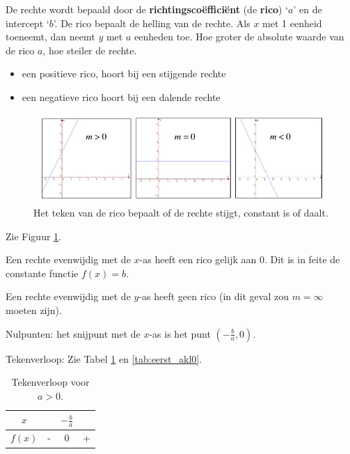 \noindent De rechte wordt bepaald door de \textbf{richtingsco\"effici\"ent}
(de \textbf{rico}) \textquoteleft $a$\textquoteright{} en de intercept
\textquoteleft $b$\textquoteright . De rico bepaalt de helling van
de rechte. Als $x$ met 1 eenheid toeneemt, dan neemt $y$ met $a$
eenheden toe. Hoe groter de absolute waarde van de rico $a$, hoe
steiler de rechte.
\begin{itemize}
\item een positieve rico, hoort bij een stijgende rechte
\item een negatieve rico hoort bij een dalende rechte
\end{itemize}
\begin{figure}[h]
\centering{}\includegraphics[width=\linewidth]{2_elem_rekenvaardigheden_B/inputs/eerstegraadsfuncties2.jpg} 
\caption{Het teken van de rico bepaalt of de rechte stijgt, constant is of daalt.}
\label{fig:rico}
\end{figure}

Zie Figuur \ref{fig:rico}.

\noindent Een rechte evenwijdig met de $x$-as heeft een rico gelijk
aan 0. Dit is in feite de constante functie $f(x)=b$.

\noindent Een rechte evenwijdig met de $y$-as heeft geen rico (in
dit geval zou $m=\infty$ moeten zijn). 

Nulpunten: het snijpunt met de $x$-as is het
punt $(-\frac{b}{a},0)$.

%

Tekenverloop: Zie Tabel \ref{tab:eerst_agr0} en \ref{tab:eerst_akl0}.
\begin{table}[h]
	\centering\begin{tabular}{c||c|c|c}
		$x$ &  & $-\frac{b}{a}$ & \\
		\hline 
		$f(x)$ & - & 0 & +\\
	\end{tabular}
\caption{Tekenverloop voor $a>0$.}
\label{tab:eerst_agr0}
\end{table}

